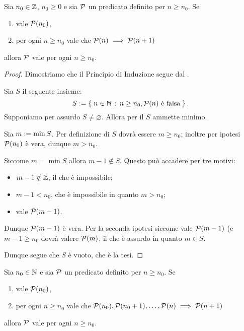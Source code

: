 \begin{theorem}
     \label{th:induzione} Sia $n_0 \in \mathbb{Z}$, $n_0 \geq 0$ e sia $\mathcal{P}$ un predicato definito per $n \geq n_0$. Se \begin{enumerate}
        \item vale $\mathcal{P}(n_0)$,
        \item per ogni $n \geq n_0$ vale che $\mathcal{P}(n) \implies \mathcal{P}(n+1)$
    \end{enumerate}
    allora $\mathcal{P}$ vale per ogni $n \geq n_0$.
\end{theorem}
\begin{proof}
    Dimostriamo che il Principio di Induzione segue dal .

    Sia $S$ il seguente insieme: \[
        S := \left\{\;n \in \mathbb{N} \,:\, n\geq n_0, \mathcal{P}(n) \text{ è falsa}\;\right\}.    
    \] Supponiamo per assurdo $S \neq \varnothing$. Allora per il  $S$ ammette minimo. 
    
    Sia $m := \min S$. Per definizione di $S$ dovrà essere $m \geq n_0$; inoltre per ipotesi $\mathcal{P}(n_0)$ è vera, dunque $m > n_0$.

    Siccome $m = \min S$ allora $m - 1 \notin S$. Questo può accadere per tre motivi: \begin{itemize}
        \item $m - 1 \notin \mathbb{Z}$, il che è impossibile;
        \item $m - 1 < n_0$, che è impossibile in quanto $m > n_0$;
        \item vale $\mathcal{P}(m-1)$.
    \end{itemize}

    Dunque $\mathcal{P}(m-1)$ è vera. Per la seconda ipotesi siccome vale $\mathcal{P}(m-1)$ (e $m - 1 \geq n_0$ dovrà valere $\mathcal{P}(m)$, il che è assurdo in quanto $m \in S$.

    Dunque segue che $S$ è vuoto, che è la tesi.
\end{proof}

\begin{theorem}
     \label{th:induzione_forte} Sia $n_0 \in \mathbb{N}$ e sia $\mathcal{P}$ un predicato definito per $n \geq n_0$. Se \begin{enumerate}
        \item vale $\mathcal{P}(n_0)$,
        \item per ogni $n \geq n_0$ vale che $\mathcal{P}(n_0), \mathcal{P}(n_0 + 1), \dots, \mathcal{P}(n) \implies \mathcal{P}(n+1)$
    \end{enumerate}
    allora $\mathcal{P}$ vale per ogni $n \geq n_0$.
\end{theorem}

